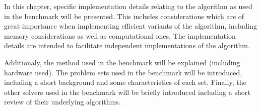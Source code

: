 In this chapter, specific implementation details relating to the algorithm as used in the benchmark will be presented.
This includes considerations which are of great importance when implementing efficient variants of the algorithm, including memory considerations as well as computational ones.
The implementation details are intended to facilitate independent implementations of the algorithm.

Additionaly, the method used in the benchmark will be explained (including hardware used).
The problem sets used in the benchmark will be introduced, including a short background and some characteristics of each set.
Finally, the other solvers used in the benchmark will be briefly introduced including a short review of their underlying algorithms.
